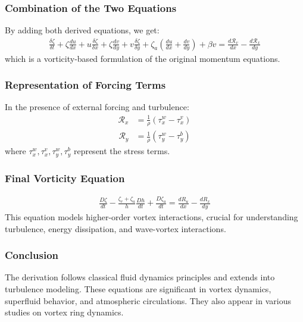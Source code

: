 \documentclass[a4paper,10pt]{article}
\begin{document}
    \subsubsection*{Combination of the Two Equations}
    By adding both derived equations, we get:
    \begin{align}
        \frac{\delta \zeta}{\delta t}+\zeta \frac{d u}{d x}+u \frac{\delta \zeta}{\delta x}+\zeta \frac{d v}{d y}+v \frac{\delta \zeta}{\delta y}+\zeta_a\left(\frac{d u}{d x}+\frac{d v}{d y}\right)+\beta v=\frac{d \mathcal{R}_v}{d x}-\frac{d \mathcal{R}_x}{d y}
    \end{align}
    which is a vorticity-based formulation of the original momentum equations.

    \subsubsection*{Representation of Forcing Terms}
    In the presence of external forcing and turbulence:
    \begin{align}
        \mathcal{R}_x &= \frac{1}{\rho}(\tau_x^w - \tau_x^v)
    \end{align}
    \begin{align}
        \mathcal{R}_y &= \frac{1}{\rho}(\tau_y^w - \tau_y^b)
    \end{align}
    where $\tau_x^w, \tau_x^v, \tau_y^w, \tau_y^b$ represent the stress terms.

    \subsubsection*{Final Vorticity Equation}
    \begin{align}
        \frac{D \zeta}{d t}-\frac{\zeta_r+\zeta_a}{h} \frac{D h}{d t}+\frac{D \zeta_a}{d t}=\frac{d R_u}{d x}-\frac{d R_x}{d y}
    \end{align}
    This equation models higher-order vortex interactions, crucial for understanding turbulence, energy dissipation, and wave-vortex interactions.

    \subsubsection*{Conclusion}
    The derivation follows classical fluid dynamics principles and extends into turbulence modeling. These equations are significant in vortex dynamics, superfluid behavior, and atmospheric circulations. They also appear in various studies on vortex ring dynamics.
\end{document}
